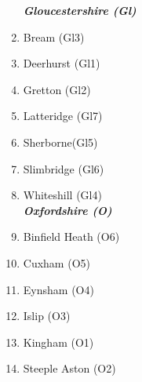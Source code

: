 \begin{refsection}
\begin{multicols}{2}
\begin{enumerate}
		\emph{\textbf{Gloucestershire (Gl)}}
		\item Bream (Gl3)
		\item Deerhurst (Gl1)
		\item Gretton (Gl2)
		\item Latteridge (Gl7)
		\item Sherborne(Gl5)
		\item Slimbridge (Gl6)
		\item Whiteshill (Gl4)\\
		\emph{\textbf{Oxfordshire (O)}}
		\item Binfield Heath (O6)
		\item Cuxham (O5)
		\item Eynsham (O4)
		\item Islip (O3)
		\item Kingham (O1)
		\item Steeple Aston (O2)
	\end{enumerate}
  \end{multicols}
\end{refsection}
		
